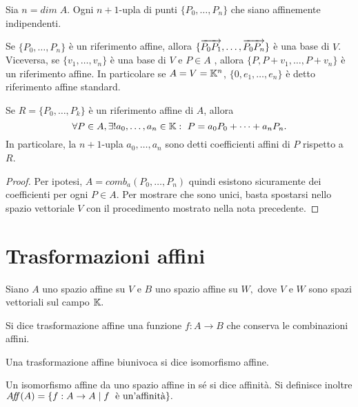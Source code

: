 \begin{definition}
 Sia $n=dim\;A$. Ogni $n+1$-upla di punti $\{P_0,\dots, P_n\}$
 che siano affinemente indipendenti.
 \end{definition}
 
 \begin{remark}
 Se $\{P_0,\dots, P_n\}$ è un riferimento affine, allora
 $\{\overrightarrow{P_0P_1},\dots,\overrightarrow{P_0P_n}\}$ è una base di $V$. Viceversa, se $\{v_1,\dots,v_n\}$ è una base di
 $V$ e $P\in A$ , allora $\{P,P+v_1,\dots,P+v_n\}$ è un riferimento affine. In particolare se
 $A=V=\mathbb K^n$, $\{0,e_1,\dots,e_n\}$ è detto riferimento affine standard.
 \end{remark}
 
 \begin{proposition}
 Se $R=\{P_0,\dots,P_k\}$ è un riferimento affine di $A$, allora
 \[
	\forall P\in A, \exists ! a_0,\dots,a_n\in \mathbb K :\ P=a_0P_0+\dots+a_nP_n.
 \]
 In particolare, la $n+1$-upla $a_0,\dots,a_n$ sono detti coefficienti affini di $P$
 rispetto a $R$.
 \end{proposition}
 
 \begin{proof}
 Per ipotesi, $A=comb_a(P_0,\dots,P_n)$ quindi esistono sicuramente dei coefficienti per ogni
 $P\in A$. Per mostrare che sono unici, basta spostarsi nello spazio vettoriale
 $V$ con il procedimento mostrato nella nota precedente.
 \end{proof}

	\section{Trasformazioni affini}
	
 Siano $A$ uno spazio affine su $V$ e $B$ uno spazio affine su $W,$ dove $V$ e
 $W$ sono spazi vettoriali sul campo $\mathbb K.$
 
 \begin{definition}
 Si dice trasformazione affine una funzione $f:A\to B$ che conserva le combinazioni affini.
 \end{definition}
 
 \begin{definition}
 Una trasformazione affine biunivoca si dice isomorfismo affine.
 \end{definition}
 
 \begin{definition}
 Un isomorfismo affine da uno spazio affine in sé si dice affinità. Si definisce inoltre
 $A\!f\!\!f(A)=\{f:A\to A\;|\; f\; \text{ è un'affinità}\}.$
 \end{definition}
 

